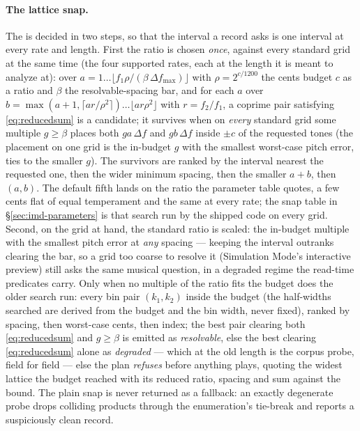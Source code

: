 \documentclass[11pt,a4paper]{article}
\begin{document}
\paragraph{The lattice snap.} The  is decided in two
steps, so that the interval a record asks is one interval at every rate
and length. First the ratio is chosen \emph{once}, against every standard
grid at the same time (the four supported rates, each at the length it
is meant to analyze at): over $a = 1 \ldots \lfloor f_1 \rho / (\beta\,
\Delta f_{\max})\rfloor$ with $\rho = 2^{c/1200}$ the cents budget $c$ as
a ratio and $\beta$ the resolvable-spacing bar, and for each $a$ over
$b = \max(a + 1, \lceil a r/\rho^2\rceil) \ldots \lfloor a r \rho^2\rfloor$
with $r = f_2/f_1$, a coprime pair satisfying \eqref{eq:reducedsum} is a
candidate; it survives when on \emph{every} standard grid some multiple
$g \ge \beta$ places both $g a\,\Delta f$ and $g b\,\Delta f$ inside
$\pm c$ of the requested tones (the placement on one grid is the in-budget
$g$ with the smallest worst-case pitch error, ties to the smaller $g$).
The survivors are ranked by the interval nearest the requested one, then
the wider minimum spacing, then the smaller $a + b$, then $(a, b)$. The
default fifth lands on the ratio the parameter table quotes, a few cents
flat of equal temperament and the same at every rate; the snap table in
\S\ref{sec:imd-parameters} is that search run by the shipped code on every
grid. Second, on the grid at hand, the standard ratio is scaled: the
in-budget multiple with the smallest pitch error at \emph{any} spacing ---
keeping the interval outranks clearing the bar, so a grid too coarse to
resolve it (Simulation Mode's interactive preview) still asks the same
musical question, in a degraded regime the read-time predicates carry.
Only when no multiple of the ratio fits the budget does the older search
run: every bin pair $(k_1, k_2)$ inside the budget (the half-widths
searched are derived from the budget and the bin width, never fixed),
ranked by spacing, then worst-case cents, then index; the best pair
clearing both \eqref{eq:reducedsum} and $g \ge \beta$ is emitted as
\emph{resolvable}, else the best clearing \eqref{eq:reducedsum} alone as
\emph{degraded} --- which at the old length is the corpus probe, field
for field --- else the plan \emph{refuses} before anything plays, quoting
the widest lattice the budget reached with its reduced ratio, spacing and
sum against the bound. The plain snap is never returned as a fallback: an
exactly degenerate probe drops colliding products through the
enumeration's tie-break and reports a suspiciously clean record.
\end{document}
